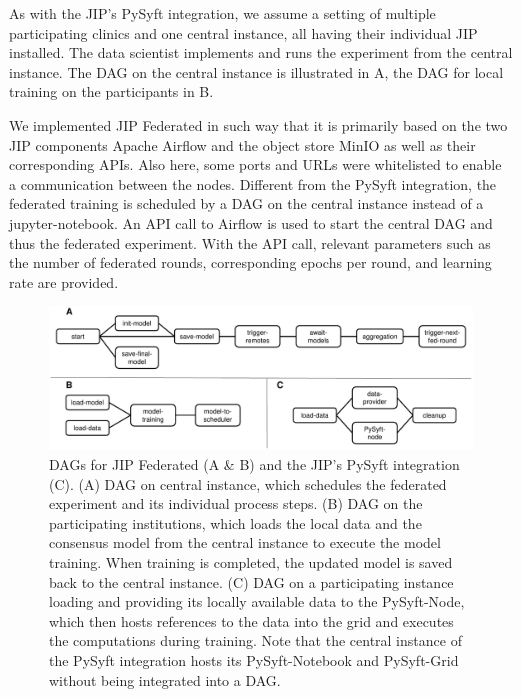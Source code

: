 As with the JIP's PySyft integration, we assume a setting of multiple participating clinics and one central instance, all having their individual JIP installed. The data scientist implements and runs the experiment from the central instance.
The DAG on the central instance is illustrated in  A, the DAG for local training on the participants in  B.

We implemented JIP Federated in such way that it is primarily based on the two JIP components Apache Airflow and the object store MinIO as well as their corresponding APIs. Also here, some ports and URLs were whitelisted to enable a communication between the nodes. Different from the PySyft integration, the federated training is scheduled by a DAG on the central instance instead of a jupyter-notebook. An API call to Airflow is used to start the central DAG and thus the federated experiment. With the API call, relevant parameters such as the number of federated rounds, corresponding epochs per round, and learning rate are provided.

\begin{figure}[htbp]
    \centerline{\includegraphics[width=1\textwidth]{1_Figures/dags.pdf}}
    \caption[DAGs for JIP Federated and the JIP's PySyft integration]{DAGs for JIP Federated (A \& B) and the JIP's PySyft integration (C). (A) DAG on central instance, which schedules the federated experiment and its individual process steps. (B) DAG on the participating institutions, which loads the local data and the consensus model from the central instance to execute the model training. When training is completed, the updated model is saved back to the central instance.  (C) DAG on a participating instance loading and providing its locally available data to the PySyft-Node, which then hosts references to the data into the grid and executes the computations during training. Note that the central instance of the PySyft integration hosts its PySyft-Notebook and PySyft-Grid without being integrated into a DAG.}
\label{fig:Dags}
\end{figure}

